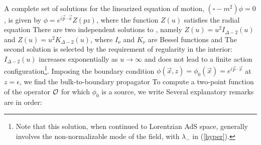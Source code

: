 A complete set of solutions for the linearized equation of motion,
$(\square - m^2) \phi = 0$, is given by $\phi = e^{i \vec{p} \cdot
\vec{x}} Z(pz)$, where the function $Z(u)$ satisfies the radial equation
 There are two independent solutions to \BesselEq, namely $Z(u) = u^2
I_{\Delta-2}(u)$ and $Z(u) = u^2 K_{\Delta-2}(u)$, where $I_\nu$ and
   $K_\nu$ are Bessel functions and
 The second solution is selected by the requirement of regularity in the
interior: $I_{\Delta-2}(u)$ increases exponentially as $u\to\infty$ and
does not lead to a finite action configuration\footnote{Note that this
solution, when continued to Lorentzian AdS space, generally involves
the non-normalizable mode of the field, with $\lambda_-$ in 
(\ref{hyper}).}.  Imposing the boundary
condition $\phi(\vec{x},z) = \phi_0(\vec{x}) = e^{i \vec{p} \cdot \vec{x}}$
at $z = \epsilon$, we find the bulk-to-boundary propagator 
 To compute a two-point function of the operator ${\cal O}$ for which
$\phi_0$ is a source, we write
 Several explanatory remarks are in order: 
